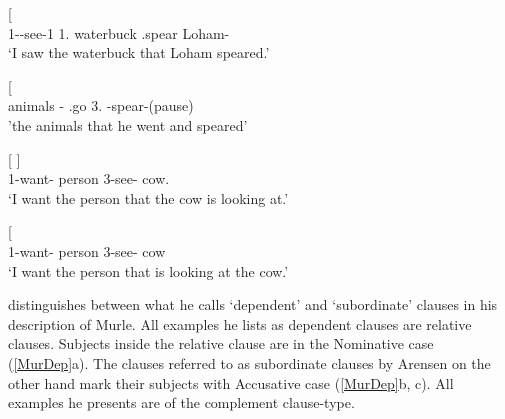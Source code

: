\begin{exe}\ex\label{TenRel} 
\begin{xlist}
\ex\gll{}    {\rm[}   \textipa{l\=*oh\'{\=*a}m\textbf{-i}}{\rm]}\\
1-\pfv{}-see-1\sg{} 1\sg{}.\nom{} waterbuck \am{} \pst{} \pfv{}.spear Loham-\nom{}\\
\glt `I saw the waterbuck that Loham speared.' 

\ex\gll{}  {\rm[}  \textbf{} \textipa{\'a-k\'at-a}{\rm]}\\
animals \am{}-\pl{} \pfv{}.go 3\sg{}.\nom{} \pfv{}-spear-{(pause)}\\
\glt 'the animals that he went and speared' 
\end{xlist}
\end{exe}

\begin{exe}\ex\label{NanRel}
\begin{xlist}
\ex\gll{}   {\rm[}  \textbf{}{\rm]}\\
1\sg{}-want-\ipfv{} person \relativ{} 3-see-\ipfv{} cow.\nom{}\\
\glt `I want the person that the cow is looking at.'

\ex\gll{}   {\rm[}  \textipa{te:t\`a}{\rm]}\\
1\sg{}-want-\ipfv{} person \relativ{} 3-see-\ipfv{} cow\\
\glt `I want the person that is looking at the cow.'

\end{xlist}
\end{exe}

\citet[112--114]{Arensen:1982} distinguishes between what he calls `dependent' and `subordinate' clauses in his description of Murle. 
All examples he lists as dependent clauses are relative clauses. 
Subjects inside the relative clause are in the Nominative  case (\ref{MurDep}a). 
The clauses referred to as subordinate clauses by Arensen on the other hand mark their subjects with Accusative case (\ref{MurDep}b, c). 
All examples he presents are of the complement clause-type.

